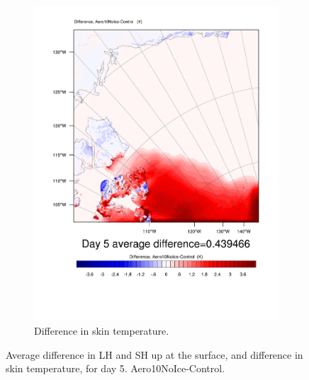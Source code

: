 \begin{figure}
	\begin{subfigure}{0.48\textwidth}
		\includegraphics[width=\textwidth]{results/aero10ni/diff_Aero10NoIce_TSK_Day5.pdf}
		\caption{Difference in skin temperature.}
		\label{subfig:skin_r4Day5}
	\end{subfigure}
	\caption{Average difference in LH and SH up at the surface, and difference in skin temperature, for day 5. Aero10NoIce-Control.}
	\label{fig:lhshskin_r4Day5}
\end{figure}


